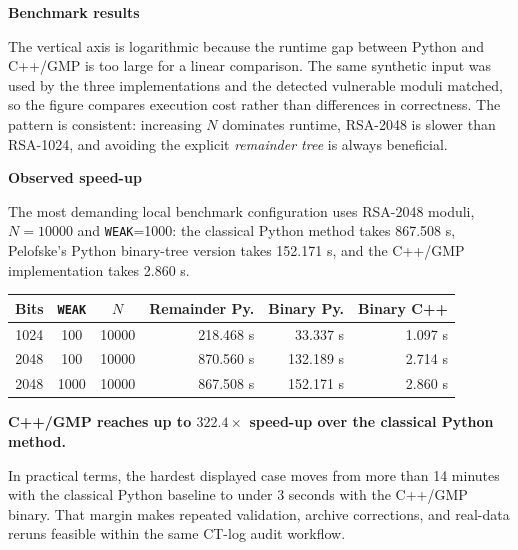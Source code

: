 \documentclass{article}
\newlength{\postercolwidth}
\newcommand{\smalltable}{\fontsize{22}{26}\selectfont}
\newenvironment{posterblock}[1]
{
  \vspace{1.0cm}
  \noindent
  \begin{minipage}{\postercolwidth}
  \colorbox{posterblue}{%
    \parbox{\dimexpr\postercolwidth-2\fboxsep\relax}{%
      \color{white}\bfseries\fontsize{32}{38}\selectfont #1
    }%
  }
  \par\vspace{0.22cm}
  \color{postergray}
  \fontsize{29}{35}\selectfont
}
{
  \end{minipage}
  \par
}
\begin{document}
\begin{minipage}[t]{\postercolwidth}
\begin{posterblock}{Benchmark results}
The vertical axis is logarithmic because the runtime gap between Python and
C++/GMP is too large for a linear comparison. The same synthetic input was used
by the three implementations and the detected vulnerable moduli matched, so the
figure compares execution cost rather than differences in correctness. The
pattern is consistent: increasing $N$ dominates runtime, RSA-2048 is slower than
RSA-1024, and avoiding the explicit \textit{remainder tree} is always beneficial.
\end{posterblock}

\begin{posterblock}{Observed speed-up}
The most demanding local benchmark configuration uses RSA-2048 moduli,
$N=10000$ and \texttt{WEAK}=1000: the classical Python method takes 867.508 s,
Pelofske's Python binary-tree version takes 152.171 s, and the C++/GMP
implementation takes 2.860 s.

\vspace{0.25cm}
{\smalltable
\begin{center}
\begin{tabular}{cccrrr}
\toprule
Bits & \texttt{WEAK} & $N$ & Remainder Py. & Binary Py. & Binary C++ \\
\midrule
1024 & 100  & 10000 & 218.468 s & 33.337 s  & 1.097 s \\
2048 & 100  & 10000 & 870.560 s & 132.189 s & 2.714 s \\
2048 & 1000 & 10000 & 867.508 s & 152.171 s & 2.860 s \\
\bottomrule
\end{tabular}
\end{center}
}

\vspace{0.2cm}
{\centering
  \colorbox{posterorange}{%
    \parbox{0.86\postercolwidth}{%
      \centering\color{white}\bfseries
      C++/GMP reaches up to $322.4\times$ speed-up over the classical Python method.
    }%
  }\par
}

\vspace{0.12cm}
In practical terms, the hardest displayed case moves from more than 14 minutes
with the classical Python baseline to under 3 seconds with the C++/GMP binary.
That margin makes repeated validation, archive corrections, and real-data reruns
feasible within the same CT-log audit workflow.
\end{posterblock}

\end{minipage}
\hfill
\end{document}
